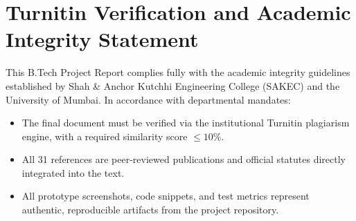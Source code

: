 \section{Turnitin Verification and Academic Integrity Statement}
\label{sec:app_plag}
This B.Tech Project Report complies fully with the academic integrity guidelines established by Shah \& Anchor Kutchhi Engineering College (SAKEC) and the University of Mumbai. In accordance with departmental mandates:
\begin{itemize}
    \item The final document must be verified via the institutional Turnitin plagiarism engine, with a required similarity score $\le 10\%$.
    \item All 31 references are peer-reviewed publications and official statutes directly integrated into the text.
    \item All prototype screenshots, code snippets, and test metrics represent authentic, reproducible artifacts from the project repository.
\end{itemize}
